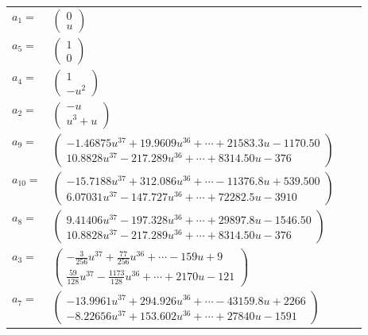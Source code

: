 \documentclass[1p]{elsarticle_modified}
\theoremstyle{definition}
\begin{document}
\begin{tabular}{m{7pt} m{180pt} m{7pt} m{180pt} }
\flushright $a_{1}=$&$\begin{pmatrix}0\\u\end{pmatrix}$ \\
\flushright $a_{5}=$&$\begin{pmatrix}1\\0\end{pmatrix}$ \\
\flushright $a_{4}=$&$\begin{pmatrix}1\\- u^2\end{pmatrix}$ \\
\flushright $a_{2}=$&$\begin{pmatrix}- u\\u^3+u\end{pmatrix}$ \\
\flushright $a_{9}=$&$\begin{pmatrix}-1.46875 u^{37}+19.9609 u^{36}+\cdots+21583.3 u-1170.50\\10.8828 u^{37}-217.289 u^{36}+\cdots+8314.50 u-376\end{pmatrix}$ \\
\flushright $a_{10}=$&$\begin{pmatrix}-15.7188 u^{37}+312.086 u^{36}+\cdots-11376.8 u+539.500\\6.07031 u^{37}-147.727 u^{36}+\cdots+72282.5 u-3910\end{pmatrix}$ \\
\flushright $a_{8}=$&$\begin{pmatrix}9.41406 u^{37}-197.328 u^{36}+\cdots+29897.8 u-1546.50\\10.8828 u^{37}-217.289 u^{36}+\cdots+8314.50 u-376\end{pmatrix}$ \\
\flushright $a_{3}=$&$\begin{pmatrix}-\frac{3}{256} u^{37}+\frac{77}{256} u^{36}+\cdots-159 u+9\\\frac{59}{128} u^{37}-\frac{1173}{128} u^{36}+\cdots+2170 u-121\end{pmatrix}$ \\
\flushright $a_{7}=$&$\begin{pmatrix}-13.9961 u^{37}+294.926 u^{36}+\cdots-43159.8 u+2266\\-8.22656 u^{37}+153.602 u^{36}+\cdots+27840 u-1591\end{pmatrix}$ \\

\end{tabular}
\end{document}
